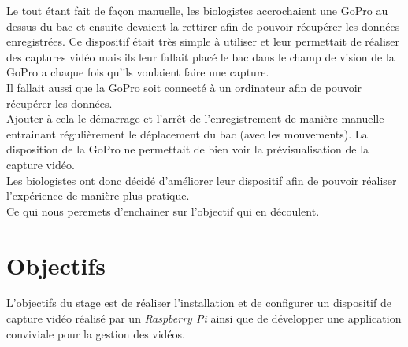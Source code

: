     \vspace{1.6cm}

    \begin{flushleft}
        Le tout étant fait de façon manuelle, les biologistes accrochaient une GoPro au dessus du bac et ensuite devaient la rettirer afin de pouvoir récupérer les données enregistrées. Ce dispositif était très simple à utiliser et leur permettait de réaliser des captures vidéo mais ils leur fallait placé le bac dans le champ de vision de la GoPro a chaque fois qu'ils voulaient faire une capture.\\[0.2cm]
        
        Il fallait aussi que la GoPro soit connecté à un ordinateur afin de pouvoir récupérer les données.\\[0.2cm]

        Ajouter à cela le démarrage et l'arrêt de l'enregistrement de manière manuelle entrainant régulièrement le déplacement du bac (avec les mouvements). La disposition de la GoPro ne permettait de bien voir la prévisualisation de la capture vidéo.\\[0.2cm]

        Les biologistes ont donc décidé d'améliorer leur dispositif afin de pouvoir réaliser l'expérience de manière plus pratique.\\[0.2cm]

        Ce qui nous peremets d'enchainer sur l'objectif qui en découlent.

    \end{flushleft}

    \vspace{0.1cm}


    \section{Objectifs}
    L'objectifs du stage est de réaliser l'installation et de configurer un dispositif de capture vidéo réalisé par un \textit{Raspberry Pi} ainsi que de développer une application conviviale pour la gestion des vidéos.

    \vspace{0.1cm}

